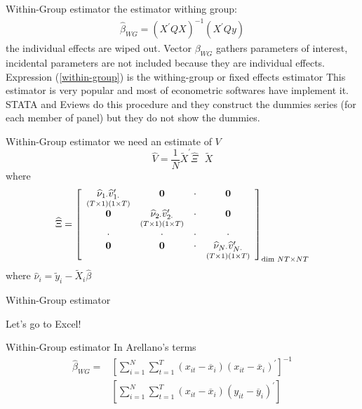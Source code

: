 \begin{frame}{Within-Group estimator}
	the estimator withing group:
		\begin{gather}
			\widehat{\beta}_{WG}=\left(X^{\prime }QX\right)^{-1}\left(X^{\prime}Qy\right) \label{within-group}
		\end{gather}
	the individual effects are wiped out. Vector $\beta_{WG}$ gathers parameters of interest, incidental parameters are not included because they are individual effects. Expression (\ref{within-group}) is the withing-group or fixed effects estimator This estimator is very popular and most of econometric softwares have implement it. STATA and Eviews do this procedure and they construct the dummies series (for each member of panel) but they do not show the dummies.
\end{frame}
\begin{frame}{Within-Group estimator}
	we need an estimate of $V$
		$$\widehat{V}=\frac{1}{N}\widetilde{X}^{\prime }\widehat{\Xi }\text{ } \widetilde{X}$$
	where
$$\widehat{\Xi }=\left[ 
		\begin{array}{cccc}
			\underset{\left( T\times 1\right) \left( 1\times T\right) }{\widehat{\nu }%
				_{1\cdot }\widehat{v}_{1\cdot }^{\prime }} & \mathbf{0} & \cdot & \mathbf{0}
			\\ 
			\mathbf{0} & \underset{\left( T\times 1\right) \left( 1\times T\right) }{%
				\widehat{\nu }_{2\cdot }\widehat{v}_{2\cdot }^{\prime }} & \cdot & \mathbf{0}
			\\ 
			\cdot & \cdot & \cdot & \cdot \\ 
			\mathbf{0} & \mathbf{0} & \cdot & \underset{\left( T\times 1\right) \left(
				1\times T\right) }{\widehat{\nu }_{N\cdot }\widehat{v}_{N\cdot }^{\prime }}%
		\end{array}
\right]_{\dim \, NT\times NT}$$
	where $\widehat{\nu}_{i}=\widetilde{y}_{i}-\widetilde{X}_{i}\widehat{\beta}$
\end{frame}
\begin{frame}{Within-Group estimator}
	\begin{center}
		\Huge{Let's go to Excel!}
	\end{center}
\end{frame}
\begin{frame}{Within-Group estimator}
	In Arellano's terms
		\begin{align*}
			\widehat{\beta }_{WG}  = & \left[ \sum_{i=1}^{N}\sum_{t=1}^{T}\left( x_{it}-%
			\overline{x}_{i}\right) \left( x_{it}-\overline{x}_{i}\right) ^{\prime }%
			\right] ^{-1} \\
			& \left[ \sum_{i=1}^{N}\sum_{t=1}^{T}\left( x_{it}-\overline{x}_{i}\right)
			\left( y_{it}-\overline{y}_{i}\right) ^{\prime }\right]
		\end{align*}
\end{frame}
